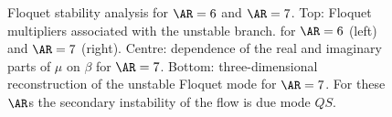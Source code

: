 \documentclass[onecolumn,notitlepage,superscriptaddress, amsmath,amssymb,longbibliographyaps,floatfix]{revtex4-1}
\begin{document}
\begin{figure}
  \caption{Floquet stability analysis for $\AR=6$ and $\AR=7$. Top: Floquet multipliers associated with the unstable branch. for $\AR=6$ (left) and $\AR=7$ (right). Centre: dependence of the real and imaginary parts of $\mu$ on $\beta$ for $\AR=7$. Bottom: three-dimensional reconstruction of the unstable Floquet mode for $\AR=7$. For these $\AR$s the secondary instability of the flow is due mode $QS$.}
  \label{fig:mult_AR7s}
\end{figure}
\end{document}
